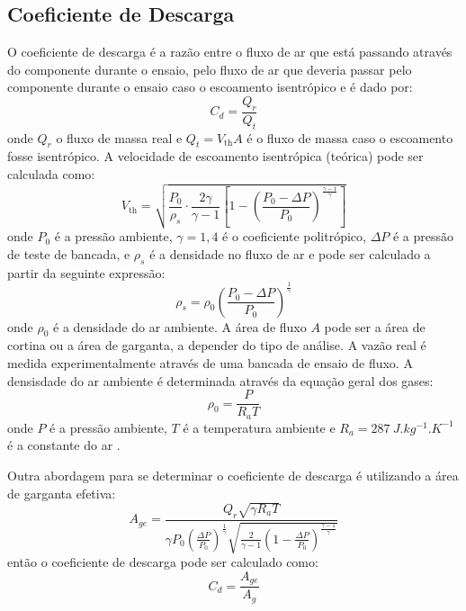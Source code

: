 \subsection{Coeficiente de Descarga}

O coeficiente de descarga é a razão entre o fluxo de ar que está passando através do componente durante o ensaio, pelo fluxo de ar que deveria passar pelo componente durante o ensaio caso o escoamento isentrópico e é dado por:
%
\begin{equation}
    C_d = \frac{Q_r}{Q_t}
    \label{eq:coef_descarga}
\end{equation}
%
onde $Q_r$ o fluxo de massa real e $Q_t = V_{\text{th}} A$ é o fluxo de massa caso o escoamento fosse isentrópico. A velocidade de escoamento isentrópica (teórica) pode ser calculada como:
%
\begin{equation}
    V_{\text{th}} = \sqrt{\frac{P_0}{\rho_s} \cdot \frac{2\gamma}{\gamma-1} \left[1 - \left( \frac{P_0 - \Delta P}{P_0} \right)^{\frac{\gamma-1}{\gamma}}\right]}
    \label{eq:velocidade_isentropica}
\end{equation}
%
onde $P_0$ é a pressão ambiente, $\gamma = 1,4$ é o coeficiente politrópico, $\Delta P$ é a pressão de teste de bancada, e $\rho_s$ é a densidade no fluxo de ar e pode ser calculado a partir da seguinte expressão:
%
\begin{equation}
    \rho_s = \rho_0 \left( \frac{P_0 - \Delta P}{P_0} \right)^{\frac{1}{\gamma}}
\end{equation}
%
onde $\rho_0$ é a densidade do ar ambiente. A área de fluxo $A$ pode ser a área de cortina ou a área de garganta, a depender do tipo de análise. A vazão real é medida experimentalmente através de uma bancada de ensaio de fluxo. A densisdade do ar ambiente é determinada através da equação geral dos gases:
\begin{equation}
    \rho_0 = \frac{P}{R_aT}
\end{equation} 
%
onde $P$ é a pressão ambiente, $T$ é a temperatura ambiente e $R_a = \SI{287}{J.kg^{-1}.K^{-1}}$ é a constante do ar \cite{cengel2015mecanica}.

Outra abordagem para se determinar o coeficiente de descarga é utilizando a área de garganta efetiva:
%
\begin{equation}
    A_{ge} = \frac{Q_r \sqrt{\gamma R_aT}}{\gamma P_0 \left(\frac{\Delta P}{P_0}\right)^{\frac{1}{\gamma}} \sqrt{\frac{2}{\gamma-1} \left(1 - \frac{\Delta P}{P_0}\right)^{\frac{\gamma-1}{\gamma}} }}
    \label{eq:area_garganta_efetiva}
\end{equation}
%
então o coeficiente de descarga pode ser calculado como:
%
\begin{equation}
    C_d = \frac{A_{ge}}{A_g}
    \label{eq:coef_descarga_area_efetiva}
\end{equation}

